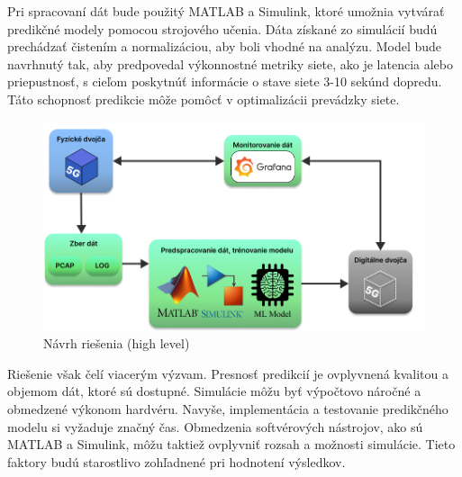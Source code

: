 \par{
Pri spracovaní dát bude použitý MATLAB a Simulink, ktoré umožnia vytvárať predikčné modely pomocou strojového učenia. Dáta získané zo simulácií budú prechádzať čistením a normalizáciou, aby boli vhodné na analýzu. Model bude navrhnutý tak, aby predpovedal výkonnostné metriky siete, ako je latencia alebo priepustnosť, s cieľom poskytnúť informácie o stave siete 3-10 sekúnd dopredu. Táto schopnosť predikcie môže pomôcť v optimalizácii prevádzky siete.
}

\begin{figure}[H]
    \centering
    \includegraphics[width=0.8\linewidth]{assets/images/high-level-model.png}
    \caption{Návrh riešenia (high level)}
\end{figure}

\par{
Riešenie však čelí viacerým výzvam. Presnosť predikcií je ovplyvnená kvalitou a objemom dát, ktoré sú dostupné. Simulácie môžu byť výpočtovo náročné a obmedzené výkonom hardvéru. Navyše, implementácia a testovanie predikčného modelu si vyžaduje značný čas. Obmedzenia softvérových nástrojov, ako sú MATLAB a Simulink, môžu taktiež ovplyvniť rozsah a možnosti simulácie. Tieto faktory budú starostlivo zohľadnené pri hodnotení výsledkov.
}





